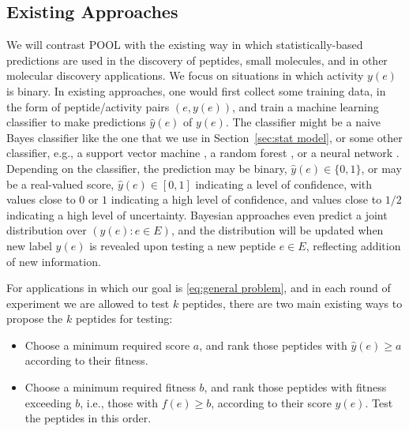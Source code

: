 \subsection{Existing Approaches} \label{sec:existing approaches}

We will contrast POOL with the existing way in which statistically-based predictions are used in the discovery of peptides, small molecules, and in other molecular discovery applications.
We focus on situations in which activity $y(e)$ is binary. In existing approaches, one would first collect some training data, in the form of peptide/activity pairs $(e,y(e))$, and train a machine learning classifier to make predictions $\hat{y}(e)$ of $y(e)$.  
The classifier might be a naive Bayes classifier like the one that we use in Section~\ref{sec:stat model}, or some other classifier, e.g., a support vector machine \citep{cortes1995support}, a random forest \citep{liaw2002classification}, or a neural network \citep{haykin2004comprehensive}.
Depending on the classifier, the prediction may be binary, $\hat{y}(e) \in \{0,1\}$, or may be a real-valued score, $\hat{y}(e) \in [0,1]$ indicating a level of confidence, with values close to $0$ or $1$ indicating a high level of confidence, and values close to $1/2$ indicating a high level of uncertainty.
Bayesian approaches even predict a joint distribution over $\left(y(e): e \in E \right)$, and the distribution will be updated when new label $y(e)$ is revealed upon testing a new peptide $e \in E$, reflecting addition of new information.

For applications in which our goal is \eqref{eq:general problem}, and in each round of experiment we are allowed to test $k$ peptides, there are two main existing ways to propose the $k$ peptides for testing:
\begin{itemize}
\item 
Choose a minimum required score $a$, and rank those peptides with $\hat{y}(e) \geq a$ according to their fitness.
\item
Choose a minimum required fitness $b$, and rank those peptides with fitness exceeding $b$, i.e., those with $f(e) \geq b$, according to their score $\hat{y}(e)$. Test the peptides in this order.
\end{itemize}

